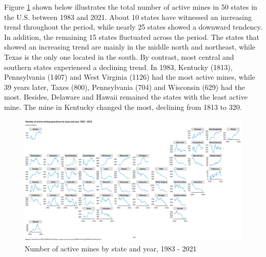 \documentclass[11pt]{article}
\begin{document}
\begin{CJK}{UTF8}{gbsn}
Figure \ref{fig:act2} shown below illustrates the total number of active mines in 50 states in the U.S. between 1983 and 2021. About 10 states have witnessed an increasing trend throughout the period, while nearly 25 states showed a downward tendency. In addition, the remaining 15 states fluctuated across the period. The states that showed an increasing trend are mainly in the middle north and northeast, while Texas is the only one located in the south. By contrast, most central and southern states experienced a declining trend. In 1983, Kentucky (1813), Pennsylvania (1407) and West Virginia (1126) had the most active mines, while 39 years later, Taxes (800), Pennsylvania (704) and Wisconsin (629) had the most. Besides, Delaware and Hawaii remained the states with the least active mine. The mine in Kentucky changed the most, declining from 1813 to 320.

\begin{figure}[h]
  \centering
  \includegraphics[width=\textwidth]{../outputs/opt_state_plot.png}
  \caption{Number of active mines by state and year, 1983 - 2021}
  \label{fig:act2}
\end{figure}





\clearpage



\end{CJK}
\end{document}
